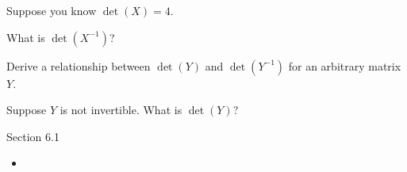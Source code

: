 \documentclass{problemset}
\begin{document}
	\question
	Suppose you know $\det(X)=4$.
	\begin{parts}
		\item What is $\det(X^{-1})$?
		\item Derive a relationship between $\det(Y)$
			and $\det(Y^{-1})$ for an arbitrary matrix $Y$.
		\item Suppose $Y$ is not invertible.  What is $\det(Y)$?
	\end{parts}

\newpage
\pagestyle{iola}

\begin{lesson}
	\newpage

	Section 6.1

	\begin{itemize}
		\item 
	\end{itemize}


	\newpage
\end{lesson}
\end{document}

